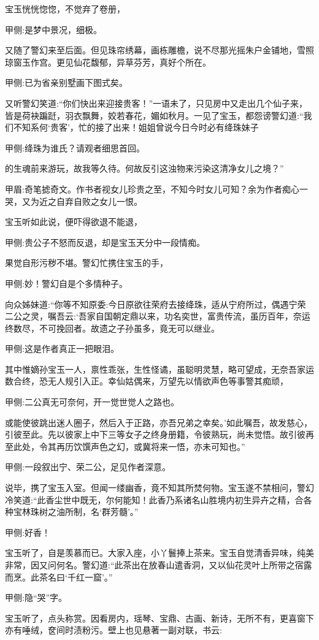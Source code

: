 \begin{parag}
    宝玉恍恍惚惚，不觉弃了卷册，\begin{note}甲侧:是梦中景况，细极。\end{note}又随了警幻来至后面。但见珠帘绣幕，画栋雕檐，说不尽那光摇朱户金铺地，雪照琼窗玉作宫。更见仙花馥郁，异草芬芳，真好个所在。\begin{note}甲侧:已为省亲别墅画下图式矣。\end{note}又听警幻笑道:“你们快出来迎接贵客！”一语未了，只见房中又走出几个仙子来，皆是荷袂蹁跹，羽衣飘舞，姣若春花，媚如秋月。一见了宝玉，都怨谤警幻道:“我们不知系何‘贵客’，忙的接了出来！姐姐曾说今日今时必有绛珠妹子\begin{note}甲侧:绛珠为谁氏？请观者细思首回。\end{note}的生魂前来游玩，故我等久待。何故反引这浊物来污染这清净女儿之境？”\begin{note}甲眉:奇笔摅奇文。作书者视女儿珍贵之至，不知今时女儿可知？余为作者痴心一哭，又为近之自弃自败之女儿一恨。\end{note}宝玉听如此说，便吓得欲退不能退，\begin{note}甲侧:贵公子不怒而反退，却是宝玉天分中一段情痴。\end{note}果觉自形污秽不堪。警幻忙携住宝玉的手，\begin{note}甲侧:妙！警幻自是个多情种子。\end{note}向众姊妹道:“你等不知原委:今日原欲往荣府去接绛珠，适从宁府所过，偶遇宁荣二公之灵，嘱吾云:‘吾家自国朝定鼎以来，功名奕世，富贵传流，虽历百年，奈运终数尽，不可挽回者。故遗之子孙虽多，竟无可以继业。\begin{note}甲侧:这是作者真正一把眼泪。\end{note}其中惟嫡孙宝玉一人，禀性乖张，生性怪谲，虽聪明灵慧，略可望成，无奈吾家运数合终，恐无人规引入正。幸仙姑偶来，万望先以情欲声色等事警其痴顽，\begin{note}甲侧:二公真无可奈何，开一觉世觉人之路也。\end{note}或能使彼跳出迷人圈子，然后入于正路，亦吾兄弟之幸矣。’如此嘱吾，故发慈心，引彼至此。先以彼家上中下三等女子之终身册籍，令彼熟玩，尚未觉悟。故引彼再至此处，令其再历饮馔声色之幻，或冀将来一悟，亦未可知也。”\begin{note}甲侧:一段叙出宁、荣二公，足见作者深意。\end{note}
\end{parag}


\begin{parag}
    说毕，携了宝玉入室。但闻一缕幽香，竟不知其所焚何物。宝玉遂不禁相问，警幻冷笑道:“此香尘世中既无，尔何能知！此香乃系诸名山胜境内初生异卉之精，合各种宝林珠树之油所制，名‘群芳髓’。”\begin{note}甲侧:好香！\end{note}宝玉听了，自是羡慕而已。大家入座，小丫鬟捧上茶来。宝玉自觉清香异味，纯美非常，因又问何名。警幻道:“此茶出在放春山遣香洞，又以仙花灵叶上所带之宿露而烹。此茶名曰‘千红一窟’。”\begin{note}甲侧:隐“哭”字。\end{note}宝玉听了，点头称赏。因看房内，瑶琴、宝鼎、古画、新诗，无所不有，更喜窗下亦有唾绒，奁间时渍粉污。壁上也见悬著一副对联，书云:
\end{parag}


